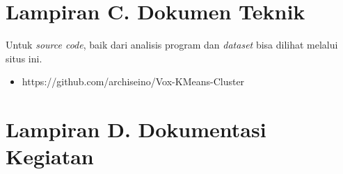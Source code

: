 




% 




\section*{\centering Lampiran C. Dokumen Teknik }


Untuk \textit{source code}, baik dari analisis program dan \textit{dataset} bisa dilihat melalui situs ini.
\begin{itemize}
    \item https://github.com/archiseino/Vox-KMeans-Cluster
\end{itemize}

\newpage 
\section*{\centering Lampiran D. Dokumentasi Kegiatan }

